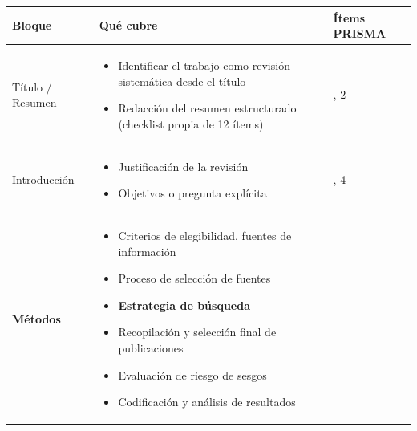 \documentclass[
]{book}
\newcounter{none} %
\begin{document}
{\def\LTcaptype{none} %
\begin{longtable}[]{@{}
  >{\raggedright\arraybackslash}p{}
  >{\raggedright\arraybackslash}p{}
  >{\centering\arraybackslash}p{}@{}}
\toprule\noalign{}
\begin{minipage}[b]{\linewidth}\raggedright
Bloque
\end{minipage} & \begin{minipage}[b]{\linewidth}\raggedright
Qué cubre
\end{minipage} & \begin{minipage}[b]{\linewidth}\centering
Ítems PRISMA
\end{minipage} \\
\midrule\noalign{}
\endhead
\bottomrule\noalign{}
\endlastfoot
Título / Resumen & \begin{minipage}[t]{\linewidth}\raggedright
\begin{itemize}
\item
  Identificar el trabajo como revisión sistemática desde el título
\item
  Redacción del resumen estructurado (checklist propia de 12 ítems)
\end{itemize}
\end{minipage} & 1, 2 \\
Introducción & \begin{minipage}[t]{\linewidth}\raggedright
\begin{itemize}
\item
  Justificación de la revisión
\item
  Objetivos o pregunta explícita
\end{itemize}
\end{minipage} & 3, 4 \\
\textbf{Métodos} & \begin{minipage}[t]{\linewidth}\raggedright
\begin{itemize}
\item
  Criterios de elegibilidad, fuentes de información
\item
  Proceso de selección de fuentes
\item
  \textbf{Estrategia de búsqueda}
\item
  Recopilación y selección final de publicaciones
\item
  Evaluación de riesgo de sesgos
\item
  Codificación y análisis de resultados

\end{itemize}
\end{minipage}
\end{longtable}}
\end{document}
